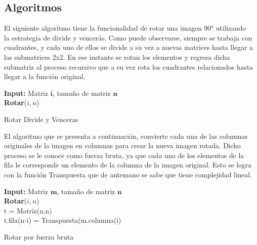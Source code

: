 \documentclass[12pt,twoside]{article}
\begin{document}
        \subsection{Algoritmos}
         El siguiente algoritmo tiene la funcionalidad de rotar una imagen 90° utilizando la estrategia de divide y vencerás. Como puede observarse, siempre se trabaja con cuadrantes, y cada uno de ellos se divide a su vez a nuevas matrices hasta llegar a las submatrices 2x2. En ese instante se rotan los elementos y regresa dicha submatriz al proceso recursivo que a su vez rota los cuadrantes relacionados hasta llegar a la función original.
        
        \begin{algorithm}[H]
\SetAlgoLined
\textbf{Input: }{Matriz $\textbf{i}$, tamaño de matriz $\textbf{n}$}\;\\
\textbf{Rotar}{($i,n$)}\\

 
 \caption{Rotar Divide y Venceras}
\end{algorithm}

El algoritmo que se presenta a continuación, convierte cada una de las columnas originales de la imagen en columnas para crear la nueva imagen rotada. Dicho proceso se le conoce como fuerza bruta, ya que cada uno de los elementos de la fila le corresponde un elemento de la columna de la imagen original. Esto se logra con la función Transpuesta que de antemano se sabe que tiene complejidad lineal.
\begin{algorithm}[H]

\textbf{Input: }{Matriz $\textbf{m}$, tamaño de matriz $\textbf{n}$}\;\\
\textbf{Rotar}{($i,n$)}\\
    t = Matriz(n,n)\;\\
        {t.fila(n-i) = Transpuesta(m.columna(i)}\\
    \EndFor
 
 \caption{Rotar por fuerza bruta}
\end{algorithm}
\end{document}
